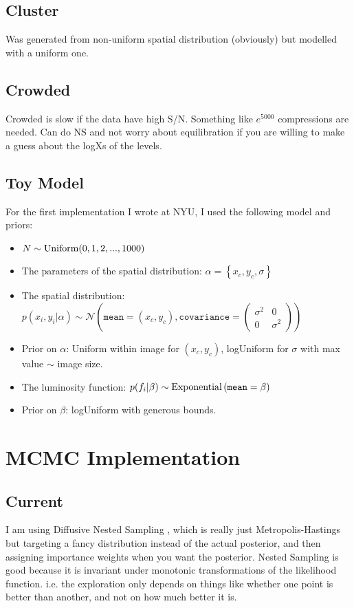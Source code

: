 \documentclass[letterpaper, 11pt]{article}
\begin{document}
\subsection{Cluster}
Was generated from non-uniform spatial distribution (obviously) but modelled
with a uniform one.

\subsection{Crowded}
Crowded is slow if the data have high S/N. Something like $e^5000$ compressions
are needed. Can do NS and not worry about equilibration if you are willing to
make a guess about the logXs of the levels.

\subsection{Toy Model}
For the first implementation I wrote at NYU, I used the following model and
priors:
\begin{itemize}
\item $N \sim \textnormal{Uniform}(0, 1, 2, ..., 1000)$ \\
\item The parameters of the spatial
distribution: $\alpha = \left\{x_c, y_c, \sigma\right\}$ \\
\item The spatial distribution: $p(x_i, y_i | \alpha)\sim\mathcal{N}\left(
\texttt{mean}=(x_c, y_c), \texttt{covariance}=
\left(\begin{array}{cc}\sigma^2 & 0 \\ 0 & \sigma^2\end{array}\right)\right)$ \\
\item Prior on $\alpha$: Uniform within image for $(x_c, y_c)$, logUniform for
$\sigma$ with max value $\sim$ image size.
\item The luminosity function: $p(f_i | \beta) \sim
\textnormal{Exponential}\left(\texttt{mean}=\beta\right)$ \\
\item Prior on $\beta$: logUniform with generous bounds.
\end{itemize}


\section{MCMC Implementation}
\subsection{Current}
I am using Diffusive Nested Sampling \citep{dnest}, which is really just
Metropolis-Hastings but targeting a fancy distribution instead of the actual
posterior, and then assigning importance weights when you want the posterior.
Nested Sampling is good because it is invariant under monotonic transformations
of the likelihood function. i.e. the exploration only depends on things like
whether one point is better than another, and not on how much better it is.
\end{document}
